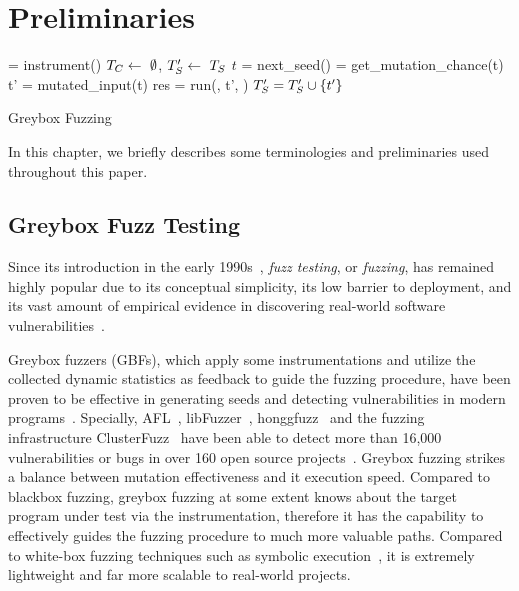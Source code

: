 \chapter{Preliminaries} \label{ch:preliminaries}

\begin{algorithm}[t]
 \small
{}
	\Prog = instrument(\ProgO) 
	$T_{C} \leftarrow~\emptyset$, $T^{\prime}_{S} \leftarrow~T_{S}$\; 
	 {
		$t$ = next\_seed(\FinalSeeds) 
		\mutChance = get\_mutation\_chance(t)  \label{line:algo:energy}
		 {
			t' = mutated\_input(t)  
			res = run(\Prog, t', \Ncal)
			 {\label{line:algo:new_cov}
				$T^{\prime}_{S} = T^{\prime}_{S}\cup\{t'\}$  \label{line:algo:triage_end}
			}
		}
	}
	\caption{Greybox Fuzzing}\label{algo:gbf}
\end{algorithm}

In this chapter, we briefly describes some terminologies and preliminaries used throughout this paper.

\section{Greybox Fuzz Testing}\label{sec:intro-gbf}
Since its introduction in the early 1990s~\cite{fuzzing1990}, \emph{fuzz testing}, or \emph{fuzzing}, has remained highly popular due to its conceptual simplicity, its low barrier to deployment, and its vast amount of empirical evidence in discovering real-world software vulnerabilities~\cite{fuzz_survey}.

Greybox fuzzers (GBFs), which apply some instrumentations and utilize the collected dynamic statistics as feedback to guide the fuzzing procedure, have been proven to be effective in generating seeds and detecting vulnerabilities in modern programs~\cite{fuzz_survey}. Specially, AFL~\cite{afl}, libFuzzer~\cite{libfuzzer}, honggfuzz~\cite{honggfuzz} and the fuzzing infrastructure ClusterFuzz~\cite{clusterfuzz} have been able to detect more than 16,000 vulnerabilities or bugs in over 160 open source projects~\cite{afl,clusterfuzz}. Greybox fuzzing strikes a balance between mutation effectiveness and it execution speed. Compared to blackbox fuzzing, greybox fuzzing at some extent knows about the target program under test via the instrumentation, therefore it has the capability to effectively guides the fuzzing procedure to much more valuable paths. Compared to white-box fuzzing techniques such as symbolic execution~\cite{dart,klee}, it is extremely lightweight and far more scalable to real-world projects.


